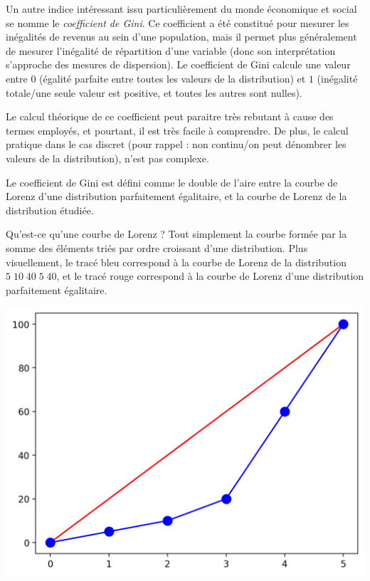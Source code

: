 \documentclass[11pt,a4paper]{article}
\begin{document}
\newpage

Un autre indice intéressant issu particulièrement du monde économique et social se nomme le \textit{coefficient de Gini}.
Ce coefficient a été constitué pour mesurer les inégalités de revenus au sein d'une population, mais il permet plus généralement de mesurer l'inégalité de répartition d'une variable (donc son interprétation s'approche des mesures de dispersion).
Le coefficient de Gini calcule une valeur entre $ 0 $ (égalité parfaite entre toutes les valeurs de la distribution) et $ 1 $ (inégalité totale/une seule valeur est positive, et toutes les autres sont nulles).

Le calcul théorique de ce coefficient peut paraitre très rebutant à cause des termes employés, et pourtant, il est très facile à comprendre.
De plus, le calcul pratique dans le cas discret (pour rappel : non continu/on peut dénombrer les valeurs de la distribution), n'est pas complexe.

\bigskip

Le coefficient de Gini est défini comme le double de l'aire entre la courbe de Lorenz d'une distribution parfaitement égalitaire, et la courbe de Lorenz de la distribution étudiée.

Qu'est-ce qu'une courbe de Lorenz ?
Tout simplement la courbe formée par la somme des éléments triés par ordre croissant d'une distribution.
Plus visuellement, le tracé bleu correspond à la courbe de Lorenz de la distribution $ 5 \; 10 \; 40 \; 5 \; 40 $, et le tracé rouge correspond à la courbe de Lorenz d'une distribution parfaitement égalitaire.

\bigskip

\begin{center}
\includegraphics[scale=0.60]{images/exemple_courbe_lorenz_simple.png}
\end{center}
\end{document}

